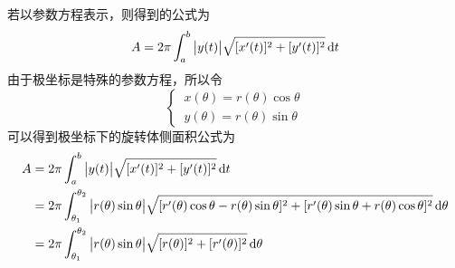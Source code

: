 若以参数方程表示，则得到的公式为
\begin{equation}
	A=2\pi\int_{a}^{b}\big| y(t) \big| \sqrt{[x'(t)]^2+[y'(t)]^2}\,{\rm{d}} t
\end{equation}
由于极坐标是特殊的参数方程，所以令
\begin{equation*}
	\begin{cases}
		\, x(\theta) = r(\theta) \cos \theta \\
		\, y(\theta) = r(\theta) \sin \theta
	\end{cases}
\end{equation*}
可以得到极坐标下的旋转体侧面积公式为
\begin{align}
	A&=2\pi\int_{a}^{b}\big| y(t) \big| \sqrt{[x'(t)]^2+[y'(t)]^2}\,{\rm{d}} t \notag\\
	& = 2\pi\int_{\theta_1}^{\theta_2}\big| r (\theta) \sin \theta\big| \sqrt{[r'(\theta) \cos \theta -r(\theta)\sin \theta ]^2+[r'(\theta)\sin \theta + r(\theta) \cos \theta]^2} \,{\rm{d}} \theta \notag \\
	& = 2\pi\int_{\theta_1}^{\theta_2}\big| r (\theta) \sin \theta\big| \sqrt{[r(\theta)]^2+[r'(\theta)]^2} \,{\rm{d}} \theta
\end{align}






